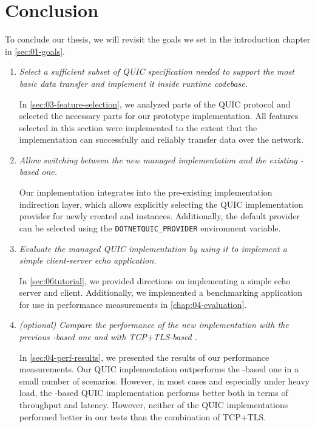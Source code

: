 \chapter*{Conclusion} 

To conclude our thesis, we will revisit the goals we set in the introduction chapter in
\autoref{sec:01-goals}.

\begin{enumerate}

  \item \textit{Select a sufficient subset of QUIC specification needed to support the most basic
data transfer and implement it inside \dotnet{} runtime codebase.}

        In \autoref{sec:03-feature-selection}, we analyzed parts of the QUIC protocol and selected
the necessary parts for our prototype implementation. All features selected in this section were
implemented to the extent that the implementation can successfully and reliably transfer data over
the network.

  \item \textit{Allow switching between the new managed implementation and the existing
\libmsquic{}-based one.}

        Our implementation integrates into the pre-existing implementation indirection layer, which
allows explicitly selecting the QUIC implementation provider for newly created \QuicListener{} and
\QuicConnection{} instances. Additionally, the default provider can be selected using the
\texttt{DOTNETQUIC_PROVIDER} environment variable.

  \item \textit{Evaluate the managed QUIC implementation by using it to implement a simple
client-server echo application.}

        In \autoref{sec:06tutorial}, we provided directions on implementing a simple echo server and
client. Additionally, we implemented a benchmarking application for use in performance measurements
in \autoref{chap:04-evaluation}.

  \item \textit{(optional) Compare the performance of the new implementation with the previous
\libmsquic{}-based one and with TCP+TLS-based .}

        In \autoref{sec:04-perf-results}, we presented the results of our performance measurements.
Our QUIC implementation outperforms the \libmsquic{}-based one in a small number of scenarios.
However, in most cases and especially under heavy load, the \libmsquic{}-based QUIC implementation
performs better both in terms of throughput and latency. However, neither of the QUIC
implementations performed better in our tests than the combination of TCP+TLS\@.

\end{enumerate}

